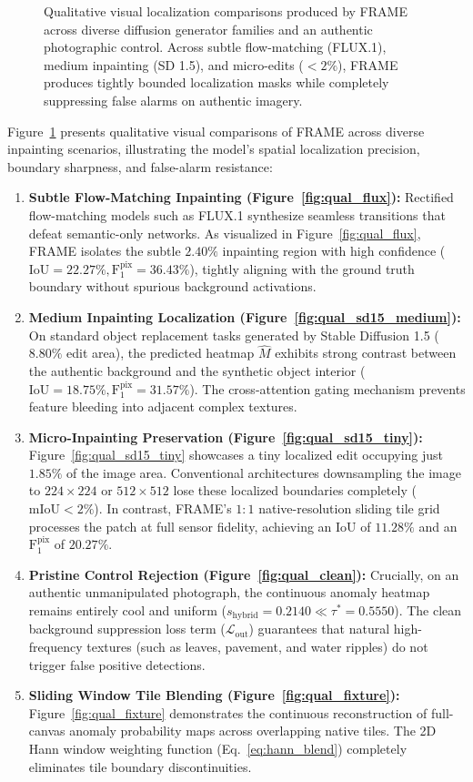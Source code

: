 \begin{figure}[t]
\caption{Qualitative visual localization comparisons produced by FRAME across diverse diffusion generator families and an authentic photographic control. Across subtle flow-matching (FLUX.1), medium inpainting (SD 1.5), and micro-edits ($<2\%$), FRAME produces tightly bounded localization masks while completely suppressing false alarms on authentic imagery.}
\label{fig:qualitative_results}
\end{figure}

Figure~\ref{fig:qualitative_results} presents qualitative visual comparisons of FRAME across diverse inpainting scenarios, illustrating the model's spatial localization precision, boundary sharpness, and false-alarm resistance:
\begin{enumerate}
    \item \textbf{Subtle Flow-Matching Inpainting (Figure~\ref{fig:qual_flux}):} Rectified flow-matching models such as FLUX.1 synthesize seamless transitions that defeat semantic-only networks. As visualized in Figure~\ref{fig:qual_flux}, FRAME isolates the subtle $2.40\%$ inpainting region with high confidence ($\mathrm{IoU} = 22.27\%, \mathrm{F}_1^{\mathrm{pix}} = 36.43\%$), tightly aligning with the ground truth boundary without spurious background activations.
    \item \textbf{Medium Inpainting Localization (Figure~\ref{fig:qual_sd15_medium}):} On standard object replacement tasks generated by Stable Diffusion 1.5 ($8.80\%$ edit area), the predicted heatmap $\hat{M}$ exhibits strong contrast between the authentic background and the synthetic object interior ($\mathrm{IoU} = 18.75\%, \mathrm{F}_1^{\mathrm{pix}} = 31.57\%$). The cross-attention gating mechanism prevents feature bleeding into adjacent complex textures.
    \item \textbf{Micro-Inpainting Preservation (Figure~\ref{fig:qual_sd15_tiny}):} Figure~\ref{fig:qual_sd15_tiny} showcases a tiny localized edit occupying just $1.85\%$ of the image area. Conventional architectures downsampling the image to $224 \times 224$ or $512 \times 512$ lose these localized boundaries completely ($\mathrm{mIoU} < 2\%$). In contrast, FRAME's $1:1$ native-resolution sliding tile grid processes the patch at full sensor fidelity, achieving an IoU of $11.28\%$ and an $\mathrm{F}_1^{\mathrm{pix}}$ of $20.27\%$.
    \item \textbf{Pristine Control Rejection (Figure~\ref{fig:qual_clean}):} Crucially, on an authentic unmanipulated photograph, the continuous anomaly heatmap remains entirely cool and uniform ($s_{\mathrm{hybrid}} = 0.2140 \ll \tau^* = 0.5550$). The clean background suppression loss term ($\mathcal{L}_{\mathrm{out}}$) guarantees that natural high-frequency textures (such as leaves, pavement, and water ripples) do not trigger false positive detections.
    \item \textbf{Sliding Window Tile Blending (Figure~\ref{fig:qual_fixture}):} Figure~\ref{fig:qual_fixture} demonstrates the continuous reconstruction of full-canvas anomaly probability maps across overlapping native tiles. The 2D Hann window weighting function (Eq.~\eqref{eq:hann_blend}) completely eliminates tile boundary discontinuities.
\end{enumerate}

